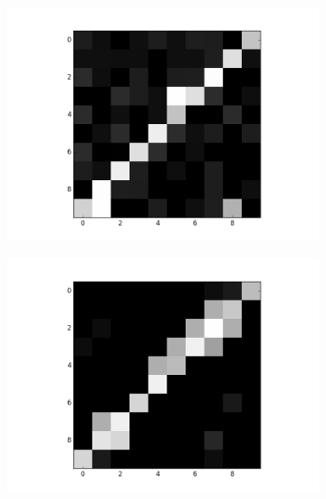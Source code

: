 \begin{figure}[h!]
	\centering
	\begin{subfigure}{.25\textwidth}
  		\centering
  		\includegraphics[width=\linewidth]{imgs/reconst/00001.png}
  		\label{fig:sub1}
	\end{subfigure}%
	\begin{subfigure}{.25\textwidth}
  		\centering
  		\includegraphics[width=\linewidth]{imgs/reconst/00003.png}
  		\label{fig:sub1}
	\end{subfigure}%
	\begin{subfigure}{.25\textwidth}
  		\centering

\end{subfigure}
\end{figure}
